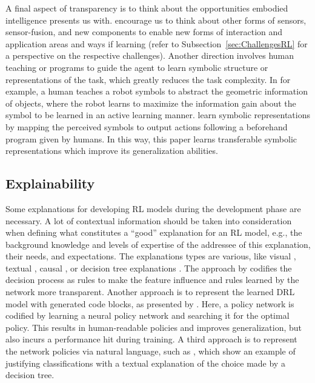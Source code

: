 \documentclass[twoside,11pt]{article}
\begin{document}
A final aspect of transparency is to think about the opportunities embodied intelligence presents us with. \citet{RoyEtAl:2021:RLRoboticsChallenges} encourage us to think about other forms of sensors, sensor-fusion, and new components to enable new forms of interaction and application areas and ways if learning (refer to Subsection~\ref{sec:ChallengesRL} for a perspective on the respective challenges). Another direction involves human teaching \citep{kulick2013active} or programs \citep{PenkovR19,sun2019program} to guide the agent to learn symbolic structure or representations of the task, which greatly reduces the task complexity. In \citet{kulick2013active} for example, a human teaches a robot symbols to abstract the geometric information of objects, where the robot learns to maximize the information gain about the symbol to be learned in an active learning manner. \citet{PenkovR19} learn symbolic representations by mapping the perceived symbols to output actions following a beforehand program given by humans. In this way, this paper learns transferable symbolic representations which improve its generalization abilities.

\subsection{Explainability}
Some explanations for developing RL models during the development phase are necessary. A lot of contextual information should be taken into consideration when defining what constitutes a ``good” explanation for an RL model, e.g., the background knowledge and levels of expertise of the addressee of this explanation, their needs, and expectations. The explanations types are various, like visual \citep{DBLP:journals/corr/abs-1912-12191,DBLP:journals/corr/abs-1912-05743}, textual \citep{fukuchi2017autonomous,HayesShah:2017:AutonomousPolicyExplanation}, causal \citep{MadumalEtAl:2020:CausalRLCFs,Madumal:2020:DistalEF}, or decision tree explanations \citep{bastani2018verifiable}. The approach by \citet{LiuEtAl:2018:LinearModelUTrees} codifies the decision process as rules to make the feature influence and rules learned by the network more transparent. Another approach is to represent the learned DRL model with generated code blocks, as presented by \citet{VermaEtAl:2018:ProgrammaticallyInterpretableRL}. Here, a policy network is codified by learning a neural policy network and searching it for the optimal policy. This results in human-readable policies and improves generalization, but also incurs a performance hit during training. A third approach is to represent the network policies via natural language, such as \citet{AlonsoEtAl:2018:xAINLBeerClassifier}, which show an example of justifying classifications with a textual explanation of the choice made by a decision tree.
\end{document}
